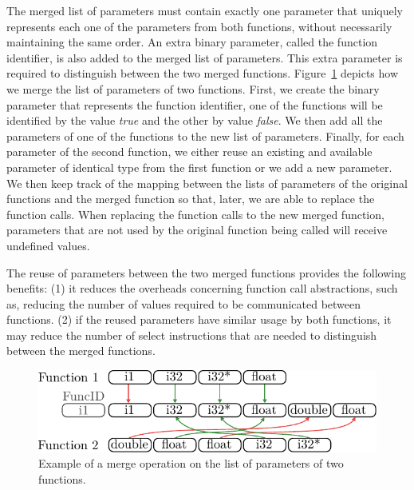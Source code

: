 The merged list of parameters must contain exactly one parameter that uniquely
represents each one of the parameters from both functions, without necessarily
maintaining the same order.
An extra binary parameter, called the function identifier, is also added to the
merged list of parameters.
This extra parameter is required to distinguish between the two merged functions.
Figure~\ref{fig:merged-params} depicts how we merge the list of parameters of
two functions.
First, we create the binary parameter that represents the function identifier,
one of the functions will be identified by the value \textit{true} and the other
by value \textit{false}.
We then add all the parameters of one of the functions to the new list of
parameters.
Finally, for each parameter of the second function, we either reuse an existing
and available parameter of identical type from the first function or we add a
new parameter.
We then keep track of the mapping between the lists of parameters of the
original functions and the merged function so that, later, we are able to
replace the function calls.
When replacing the function calls to the new merged function, parameters that
are not used by the original function being called will receive undefined values.

The reuse of parameters between the two merged functions provides the following
benefits:
(1) it reduces the overheads concerning function call abstractions, such as,
reducing the number of values required to be communicated between functions.
(2) if the reused parameters have similar usage by both functions, it may reduce
the number of select instructions that are needed to distinguish between the
merged functions.

\begin{figure}[t!]
  \centering
  \includegraphics[width=0.9\linewidth]{figs/merged-params.pdf}
  \caption{Example of a merge operation on the list of parameters of two functions.}
  \label{fig:merged-params}
\end{figure}



